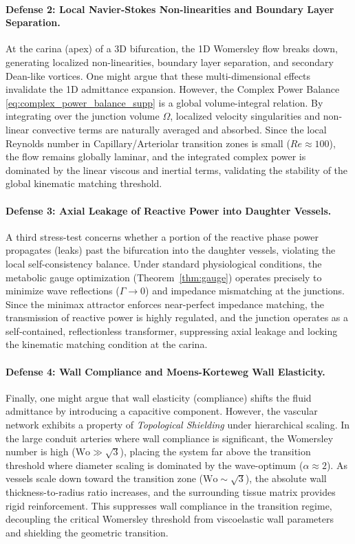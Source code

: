 \documentclass[11pt,a4paper]{article}
\theoremstyle{remark}
\begin{document}
\paragraph{Defense 2: Local Navier-Stokes Non-linearities and Boundary Layer Separation.}
At the carina (apex) of a 3D bifurcation, the 1D Womersley flow breaks down,
generating localized non-linearities, boundary layer separation, and secondary
Dean-like vortices. One might argue that these multi-dimensional effects
invalidate the 1D admittance expansion. However, the Complex Power Balance
\eqref{eq:complex_power_balance_supp} is a global volume-integral relation. By
integrating over the junction volume $\Omega$, localized velocity singularities
and non-linear convective terms are naturally averaged and absorbed. Since the
local Reynolds number in Capillary/Arteriolar transition zones is small ($Re
\approx 100$), the flow remains globally laminar, and the integrated complex
power is dominated by the linear viscous and inertial terms, validating the
stability of the global kinematic matching threshold.

\paragraph{Defense 3: Axial Leakage of Reactive Power into Daughter Vessels.}
A third stress-test concerns whether a portion of the reactive phase power
propagates (leaks) past the bifurcation into the daughter vessels, violating the
local self-consistency balance. Under standard physiological conditions, the
metabolic gauge optimization (Theorem~\ref{thm:gauge}) operates precisely to
minimize wave reflections ($\Gamma \to 0$) and impedance mismatching at the
junctions. Since the minimax attractor enforces near-perfect impedance matching,
the transmission of reactive power is highly regulated, and the junction
operates as a self-contained, reflectionless transformer, suppressing axial
leakage and locking the kinematic matching condition at the carina.

\paragraph{Defense 4: Wall Compliance and Moens-Korteweg Wall Elasticity.}
Finally, one might argue that wall elasticity (compliance) shifts the fluid
admittance by introducing a capacitive component. However, the vascular network
exhibits a property of \emph{Topological Shielding} under hierarchical scaling.
In the large conduit arteries where wall compliance is significant, the
Womersley number is high ($\mathrm{Wo} \gg \sqrt{3}$), placing the system far
above the transition threshold where diameter scaling is dominated by the
wave-optimum ($\alpha \approx 2$). As vessels scale down toward the transition
zone ($\mathrm{Wo} \sim \sqrt{3}$), the absolute wall thickness-to-radius ratio
increases, and the surrounding tissue matrix provides rigid reinforcement. This
suppresses wall compliance in the transition regime, decoupling the critical
Womersley threshold from viscoelastic wall parameters and shielding the
geometric transition.
\end{document}

